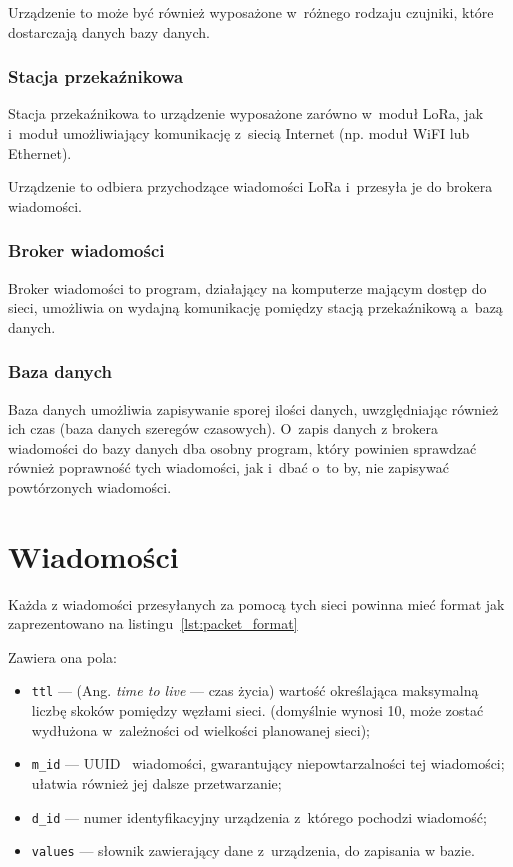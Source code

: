 Urządzenie to może być również wyposażone w~różnego rodzaju czujniki, które dostarczają danych bazy danych.

\subsubsection{Stacja przekaźnikowa}
Stacja przekaźnikowa to urządzenie wyposażone zarówno w~moduł LoRa, jak i~moduł umożliwiający komunikację z~siecią Internet (np. moduł WiFI lub Ethernet).

Urządzenie to odbiera przychodzące wiadomości LoRa i~przesyła je do brokera wiadomości.

\subsubsection{Broker wiadomości}
Broker wiadomości to program, działający na komputerze mającym dostęp do sieci, umożliwia on wydajną komunikację pomiędzy stacją przekaźnikową a~bazą danych.

\subsubsection{Baza danych}
Baza danych umożliwia zapisywanie sporej ilości danych, uwzględniając również ich czas (baza danych szeregów czasowych).
O~zapis danych z brokera wiadomości do bazy danych dba osobny program, który powinien sprawdzać również poprawność tych wiadomości, jak i~dbać o~to by, nie zapisywać powtórzonych wiadomości.

\section{Wiadomości}
Każda z wiadomości przesyłanych za pomocą tych sieci powinna mieć format jak zaprezentowano na listingu~\ref{lst:packet_format}

Zawiera ona pola:
\begin{itemize}
    \item \texttt{ttl} — (Ang. \emph{time to live} — czas życia) wartość określająca maksymalną liczbę skoków pomiędzy węzłami sieci. (domyślnie wynosi 10, może zostać wydłużona w~zależności od wielkości planowanej sieci);
    \item \texttt{m\_id} — UUID~\cite{RFC:uuid} wiadomości, gwarantujący niepowtarzalności tej wiadomości; ułatwia również jej dalsze przetwarzanie;
    \item \texttt{d\_id} — numer identyfikacyjny urządzenia z~którego pochodzi wiadomość;
    \item \texttt{values} — słownik zawierający dane z~urządzenia, do zapisania w bazie.
\end{itemize}

